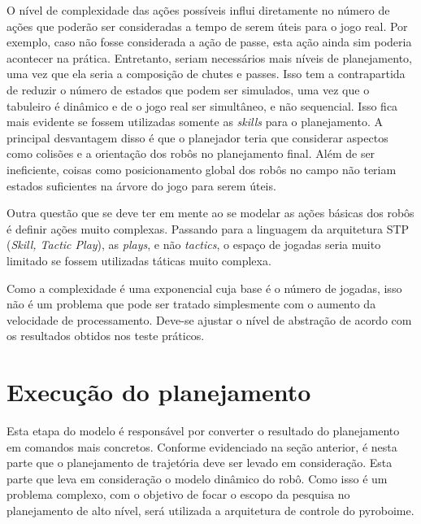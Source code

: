 O nível de complexidade das ações possíveis influi diretamente no número de
ações que poderão ser consideradas a tempo de serem úteis para o jogo real. Por
exemplo, caso não fosse considerada a ação de passe, esta ação ainda sim poderia
acontecer na prática. Entretanto, seriam necessários mais níveis de
planejamento, uma vez que ela seria a composição de chutes e passes. Isso tem a
contrapartida de reduzir o número de estados que podem ser simulados, uma vez
que o tabuleiro é dinâmico e de o jogo real ser simultâneo, e não sequencial.
Isso fica mais evidente se fossem utilizadas somente as \textit{skills} para o
planejamento. A principal desvantagem disso é que o planejador teria que
considerar aspectos como colisões e a orientação dos robôs no planejamento
final. Além de ser ineficiente, coisas como posicionamento global dos robôs no
campo não teriam estados suficientes na árvore do jogo para serem úteis.

Outra questão que se deve ter em mente ao se modelar as ações básicas dos robôs
é definir ações muito complexas. Passando para a linguagem da arquitetura STP
(\textit{Skill, Tactic Play}), as \textit{plays}, e não \textit{tactics}, o
espaço de jogadas seria muito limitado se fossem utilizadas táticas muito
complexa.

Como a complexidade é uma exponencial cuja base é o número de jogadas, isso não
é um problema que pode ser tratado simplesmente com o aumento da velocidade de
processamento.  Deve-se ajustar o nível de abstração de acordo com os resultados
obtidos nos teste práticos.

\section{Execução do planejamento}

Esta etapa do modelo é responsável por converter o resultado do planejamento em
comandos mais concretos. Conforme evidenciado na seção anterior, é nesta parte
que o planejamento de trajetória deve ser levado em consideração. Esta parte que
leva em consideração o modelo dinâmico do robô.
Como isso é um problema complexo, com o objetivo de focar o escopo da pesquisa
no planejamento de alto nível, será utilizada a arquitetura de controle do
pyroboime.

